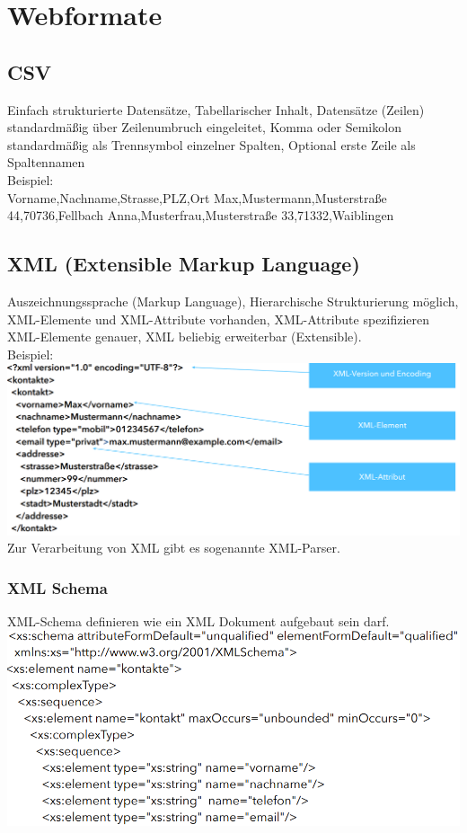 \documentclass[12pt,a4paper]{article}
\begin{document}
\section{Webformate}
\subsection{CSV}
Einfach strukturierte Datensätze, Tabellarischer Inhalt, Datensätze (Zeilen) standardmäßig über Zeilenumbruch eingeleitet, Komma oder Semikolon standardmäßig als Trennsymbol einzelner Spalten, Optional erste Zeile als Spaltennamen\\
Beispiel:\\
Vorname,Nachname,Strasse,PLZ,Ort
Max,Mustermann,Musterstraße 44,70736,Fellbach
Anna,Musterfrau,Musterstraße 33,71332,Waiblingen

\subsection{XML (Extensible Markup Language)}
Auszeichnungssprache (Markup Language), Hierarchische Strukturierung möglich, XML-Elemente und XML-Attribute vorhanden, XML-Attribute spezifizieren XML-Elemente genauer, XML beliebig erweiterbar (Extensible).\\
Beispiel:\\
\includegraphics[width=\textwidth]{Bilder/xml.PNG}
Zur Verarbeitung von XML gibt es sogenannte XML-Parser.

\subsubsection{XML Schema}
XML-Schema definieren wie ein XML Dokument aufgebaut sein darf. \\
\includegraphics[width=\textwidth]{Bilder/xml_schema.PNG}
\end{document}
